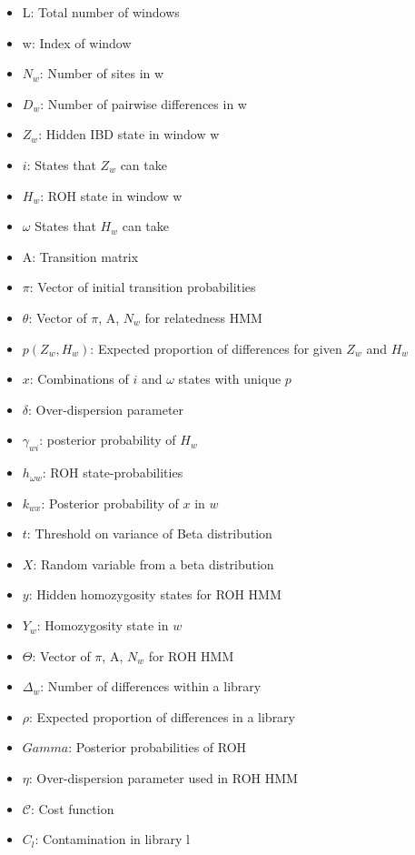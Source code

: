 \documentclass[12pt, letterpaper]{article}
\begin{document}
\begin{itemize}
\item L: Total number of windows
\item w: Index of window
\item $N_w$: Number of sites in w
\item $D_{w}$: Number of pairwise differences in w
\item $Z_w$: Hidden IBD state in window w
\item $i$: States that $Z_w$ can take 
\item $H_w$: ROH state in window w
\item $\omega$ States that $H_w$ can take
\item A: Transition matrix
\item $\pi$: Vector of initial transition probabilities
\item $\theta$: Vector of $\pi$, A, $N_w$ for relatedness HMM
\item $p(Z_w,H_w)$: Expected proportion of differences for given $Z_w$ and $H_w$
\item $x$: Combinations of $i$ and $\omega$ states with unique $p$
\item $\delta$: Over-dispersion parameter
\item $\gamma_{wi}$: posterior probability of $H_w$
\item $h_{\omega w}$: ROH state-probabilities
\item $k_{wx}$: Posterior probability of $x$ in $w$
\item $t$: Threshold on variance of Beta distribution
\item $X$: Random variable from a beta distribution
\item $y$: Hidden homozygosity states for ROH HMM
\item $Y_w$: Homozygosity state in $w$
\item $\Theta$: Vector of $\pi$, A, $N_w$ for ROH HMM
\item $\Delta_w$: Number of differences within a library 
\item $\rho$: Expected proportion of differences in a library
\item $Gamma$: Posterior probabilities of ROH
\item $\eta$: Over-dispersion parameter used in ROH HMM
\item $\mathcal{C}$: Cost function
\item $C_l$: Contamination in library l


\end{itemize}
\end{document}

